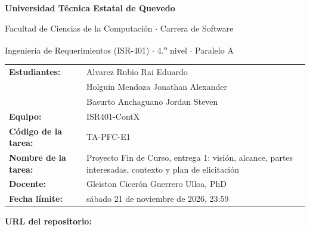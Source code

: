 \documentclass[12pt,a4paper]{article}
\begin{document}
\begin{center}
  {\Large\bfseries Universidad T\'ecnica Estatal de Quevedo\par}
  {\large Facultad de Ciencias de la Computaci\'on $\cdot$ Carrera de Software\par}
  \vspace{0.4cm}
  {\large Ingenier\'ia de Requerimientos (ISR-401) $\cdot$ 4.\textsuperscript{o} nivel $\cdot$ Paralelo A\par}
\end{center}
\vspace{1cm}

\noindent
\begin{tabular}{@{}p{4.5cm}p{11cm}@{}}
  \textbf{Estudiantes:}    & Alvarez Rubio Rai Eduardo \\
                           & Holguin Mendoza Jonathan Alexander \\
                           & Basurto Anchaguano Jordan Steven \\[0.3cm]
  \textbf{Equipo:}         & ISR401-ContX \\[0.3cm]
  \textbf{C\'odigo de la tarea:} & TA-PFC-E1 \\[0.3cm]
  \textbf{Nombre de la tarea:}   & Proyecto Fin de Curso, entrega 1: visi\'on, alcance, partes interesadas, contexto y plan de elicitaci\'on \\[0.3cm]
  \textbf{Docente:}        & Gleiston Cicer\'on Guerrero Ulloa, PhD \\[0.3cm]
  \textbf{Fecha l\'imite:} & s\'abado 21 de noviembre de 2026, 23:59 \\
\end{tabular}

\vspace{1cm}
\noindent\textbf{URL del repositorio:}\par
\vspace{0.2cm}
\end{document}
